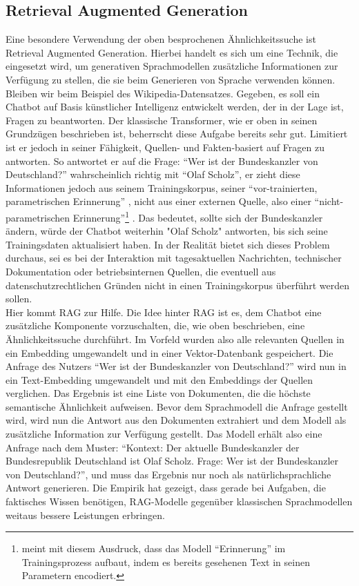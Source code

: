 \subsection{Retrieval Augmented Generation}
Eine besondere Verwendung der oben besprochenen Ähnlichkeitssuche ist Retrieval Augmented Generation. Hierbei handelt es sich um eine Technik, die eingesetzt wird, um generativen Sprachmodellen zusätzliche Informationen zur Verfügung zu stellen, die sie beim Generieren von Sprache verwenden können. Bleiben wir beim Beispiel des Wikipedia-Datensatzes. Gegeben, es soll ein Chatbot auf Basis künstlicher Intelligenz entwickelt werden, der in der Lage ist, Fragen zu beantworten. Der klassische Transformer, wie er oben in seinen Grundzügen beschrieben ist, beherrscht diese Aufgabe bereits sehr gut. Limitiert ist er jedoch in seiner Fähigkeit, Quellen- und Fakten-basiert auf Fragen zu antworten. So antwortet er auf die Frage: ``Wer ist der Bundeskanzler von Deutschland?'' wahrscheinlich richtig mit ``Olaf Scholz'', er zieht diese Informationen jedoch aus seinem Trainingskorpus, seiner ``vor-trainierten, parametrischen Erinnerung'' \parencite[S. 2, Übers. d. Verf.]{DBLP:journals/corr/abs-2005-11401}, nicht aus einer externen Quelle, also einer ``nicht-parametrischen Erinnerung''\footnote{\cite{DBLP:journals/corr/abs-2005-11401} meint mit diesem Ausdruck, dass das Modell ``Erinnerung'' im Trainingsprozess aufbaut, indem es bereits gesehenen Text in seinen Parametern encodiert.} \parencite[S. 2, Übers. d. Verf.]{DBLP:journals/corr/abs-2005-11401}. Das bedeutet, sollte sich der Bundeskanzler ändern, würde der Chatbot weiterhin "Olaf Scholz" antworten, bis sich seine Trainingsdaten aktualisiert haben. In der Realität bietet sich dieses Problem durchaus, sei es bei der Interaktion mit tagesaktuellen Nachrichten, technischer Dokumentation oder betriebsinternen Quellen, die eventuell aus datenschutzrechtlichen Gründen nicht in einen Trainingskorpus überführt werden sollen. \\

Hier kommt RAG zur Hilfe. Die Idee hinter RAG ist es, dem Chatbot eine zusätzliche Komponente vorzuschalten, die, wie oben beschrieben, eine Ähnlichkeitssuche durchführt. Im Vorfeld wurden also alle relevanten Quellen in ein Embedding umgewandelt und in einer Vektor-Datenbank gespeichert. Die Anfrage des Nutzers ``Wer ist der Bundeskanzler von Deutschland?'' wird nun in ein Text-Embedding umgewandelt und mit den Embeddings der Quellen verglichen. Das Ergebnis ist eine Liste von Dokumenten, die die höchste semantische Ähnlichkeit aufweisen. Bevor dem Sprachmodell die Anfrage gestellt wird, wird nun die Antwort aus den Dokumenten extrahiert und dem Modell als zusätzliche Information zur Verfügung gestellt. Das Modell erhält also eine Anfrage nach dem Muster: ``Kontext: Der aktuelle Bundeskanzler der Bundesrepublik Deutschland ist Olaf Scholz. Frage: Wer ist der Bundeskanzler von Deutschland?'', und muss das Ergebnis nur noch als natürlichsprachliche Antwort generieren. Die Empirik hat gezeigt, dass gerade bei Aufgaben, die faktisches Wissen benötigen, RAG-Modelle gegenüber klassischen Sprachmodellen weitaus bessere Leistungen erbringen. \parencite[Vgl. ][]{DBLP:journals/corr/abs-2005-11401}